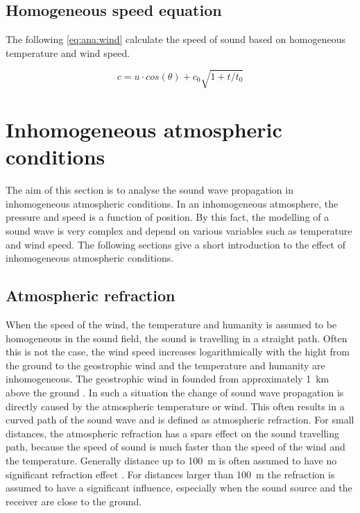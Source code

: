  
 \subsection{Homogeneous speed equation}
 The following \autoref{eq:ana:wind} calculate the speed of sound based on homogeneous temperature and wind speed.

\begin{equation}\label{eq:ana:wind}
c = u \cdot cos(\theta) + c_0 \sqrt{1+t/t_0}
\end{equation}  

\startexplain
{}
\stopexplain


 
\section{Inhomogeneous atmospheric conditions} 
The aim of this section is to analyse the sound wave propagation in inhomogeneous atmospheric conditions. In an inhomogeneous atmosphere, the pressure and speed is a function of position. By this fact, the modelling of a sound wave is very complex and depend on various variables such as temperature and wind speed. The following sections give a short introduction to the effect of inhomogeneous atmospheric conditions. 
 
 
\subsection{Atmospheric refraction}
When the speed of the wind, the temperature and humanity is assumed to be homogeneous in the sound field, the sound is travelling in a straight path. Often this is not the case, the wind speed increases logarithmically with the hight from the ground to the geostrophic wind \citep{asmos_acous_2016} and the temperature and humanity are inhomogeneous. The geostrophic wind in founded from approximately \SI{1}{\kilo\meter} above the ground \citep{geostrophic_wind}.  In such a situation the change of sound wave propagation is directly caused by the atmospheric temperature or wind. This often results in a curved path of the sound wave and is defined as atmospheric refraction. For small distances, the atmospheric refraction has a spars effect on the sound travelling path, because the speed of sound is much faster than the speed of the wind and the temperature. Generally distance up to \SI{100}{\meter} is often assumed to have no significant refraction effect \citep{effect_of_wind}. For distances larger than \SI{100}{\meter} the refraction is assumed to have a significant influence, especially when the sound source and the receiver are close to the ground.  


